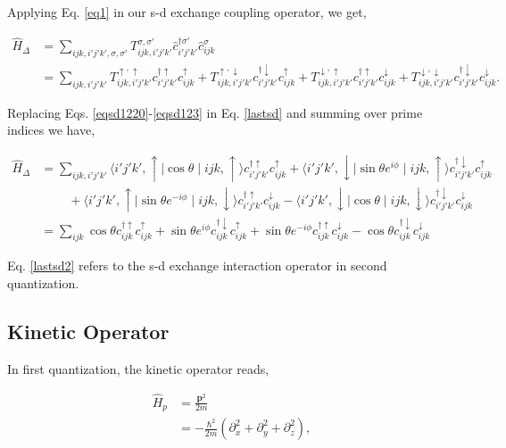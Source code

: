 \documentclass[10pt,prb,showpacs,amssymb,floatfix]{revtex4-1}
\newcommand{\nn}{\nonumber}
\newcommand{\Dlt}{\Delta}
\begin{document}
Applying Eq. \eqref{eq1} in our s-d exchange coupling operator, we get,

\begin{align}
\hat H_{\Dlt} &= \sum_{ijk,i'j'k',\sigma,\sigma'} T_{ijk,i'j'k'}^{\sigma,\sigma'} \hat{c}_{i'j'k'}^{\dagger \sigma'} \hat{c}_{ijk}^\sigma \\
&= \sum_{ijk,i'j'k'} T_{ijk,i'j'k'}^{\uparrow,\uparrow} c_{i'j'k'}^{\dagger \uparrow} c_{ijk}^\uparrow +  T_{ijk,i'j'k'}^{\uparrow,\downarrow} c_{i'j'k'}^{\dagger \downarrow} c_{ijk}^\uparrow + T_{ijk,i'j'k'}^{\downarrow,\uparrow} c_{i'j'k'}^{\dagger \uparrow} c_{ijk}^\downarrow + T_{ijk,i'j'k'}^{\downarrow,\downarrow} c_{i'j'k'}^{\dagger \downarrow} c_{ijk}^\downarrow.
\label{lastsd}
\end{align}

Replacing Eqs. \eqref{eqsd1220}-\eqref{eqsd123} in Eq. \eqref{lastsd} and summing over prime indices we have,

\begin{align}
\hat H_{\Dlt} &= \sum_{ijk,i'j'k'} \langle i'j'k',\uparrow \mid \cos\theta \mid ijk,\uparrow \rangle c_{i'j'k'}^{\dagger \uparrow} c_{ijk}^\uparrow +  \langle i'j'k',\downarrow \mid \sin\theta e^{i\phi}  \mid ijk,\uparrow \rangle c_{i'j'k'}^{\dagger \downarrow} c_{ijk}^\uparrow \nn\\ &~~~~~~~~~~+ \langle i'j'k',\uparrow \mid \sin\theta e^{-i\phi} \mid ijk,\downarrow \rangle c_{i'j'k'}^{\dagger \uparrow} c_{ijk}^\downarrow -\langle i'j'k',\downarrow \mid \cos\theta \mid ijk,\downarrow \rangle c_{i'j'k'}^{\dagger \downarrow} c_{ijk}^\downarrow \nn\\&= \sum_{ijk}  \cos\theta c_{ijk}^{\dagger \uparrow} c_{ijk}^\uparrow +  \sin\theta e^{i\phi} c_{ijk}^{\dagger \downarrow} c_{ijk}^\uparrow+  \sin\theta e^{-i\phi} c_{ijk}^{\dagger \uparrow} c_{ijk}^\downarrow - \cos\theta  c_{ijk}^{\dagger \downarrow} c_{ijk}^\downarrow
\label{lastsd2}
\end{align}

Eq. \eqref{lastsd2} refers to the s-d exchange interaction operator in second quantization.

\subsection{Kinetic Operator}

In first quantization, the kinetic operator reads, 

\begin{align}
\hat H_{p} &= \frac{\bm p^2}{2m} \nn\\
&= -\frac{\hbar^2}{2m} (\partial_x^2 +\partial_y^2+\partial_z^2 ),
\label{p}
\end{align}
\end{document}
